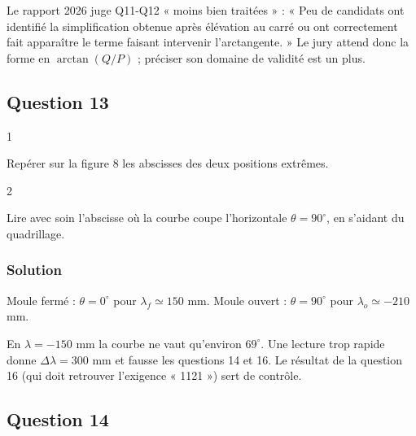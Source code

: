\documentclass[11pt,a4paper]{article}
\newcommand{\equationajustee}[1]{%
  \sbox{\boiteequation}{$\displaystyle #1$}%
  \ifdim\wd\boiteequation>\linewidth
    \[\resizebox{\linewidth}{!}{\usebox{\boiteequation}}\]%
  \else
    \[#1\]%
  \fi}
\begin{document}
\begin{jury}

Le rapport 2026 juge Q11-Q12 « moins bien traitées » : « Peu de candidats ont identifié la simplification obtenue après élévation au carré ou ont correctement fait apparaître le terme faisant intervenir l'arctangente. » Le jury attend donc la forme en \(\arctan(Q/P)\) ; préciser son domaine de validité est un plus.

\end{jury}

\hypertarget{question-13}{%
\subsection{Question 13}\label{question-13}}

\begin{indication}{1}

Repérer sur la figure 8 les abscisses des deux positions extrêmes.

\end{indication}

\begin{indication}{2}

Lire avec soin l'abscisse où la courbe coupe l'horizontale \(\theta=90^\circ\), en s'aidant du quadrillage.

\end{indication}

\hypertarget{solution-12}{%
\subsubsection{Solution}\label{solution-12}}

Moule fermé : \(\theta=0^\circ\) pour \(\lambda_f\simeq150\) mm. Moule ouvert : \(\theta=90^\circ\) pour \(\lambda_o\simeq-210\) mm.

\equationajustee{\boxed{\Delta\lambda=\lambda_f-\lambda_o\simeq360\ \text{mm}=0{,}36\ \text{m}}}

\begin{piege}

En \(\lambda=-150\) mm la courbe ne vaut qu'environ \(69^\circ\). Une lecture trop rapide donne \(\Delta\lambda=300\) mm et fausse les questions 14 et 16. Le résultat de la question 16 (qui doit retrouver l'exigence « 1121 ») sert de contrôle.

\end{piege}

\hypertarget{question-14}{%
\subsection{Question 14}\label{question-14}}
\end{document}
